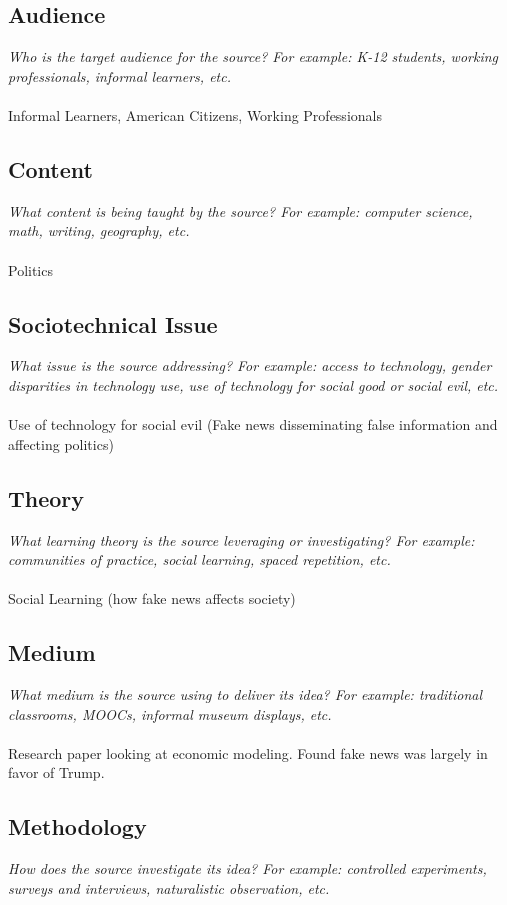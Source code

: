 \documentclass[12pt, final]{article}
\begin{document}
\subsection{Audience}
\textit{Who is the target audience for the source? For example: K-12 students, working professionals, informal learners, etc.}
\\
\\
Informal Learners, American Citizens, Working Professionals

\subsection{Content}
\textit{What content is being taught by the source? For example: computer science, math, writing, geography, etc.}
\\
\\
Politics

\subsection{Sociotechnical Issue}
\textit{What issue is the source addressing? For example: access to technology, gender disparities in technology use, use of technology for social good or social evil, etc.}
\\
\\
Use of technology for social evil (Fake news disseminating false information and affecting politics)

\subsection{Theory}
\textit{What learning theory is the source leveraging or investigating? For example: communities of practice, social learning, spaced repetition, etc.}
\\
\\
Social Learning (how fake news affects society)

\subsection{Medium}
\textit{What medium is the source using to deliver its idea? For example: traditional classrooms, MOOCs, informal museum displays, etc.}
\\
\\
Research paper looking at economic modeling. Found fake news was largely in favor of Trump.

\subsection{Methodology}
\textit{How does the source investigate its idea? For example: controlled experiments, surveys and interviews, naturalistic observation, etc.}
\end{document}
